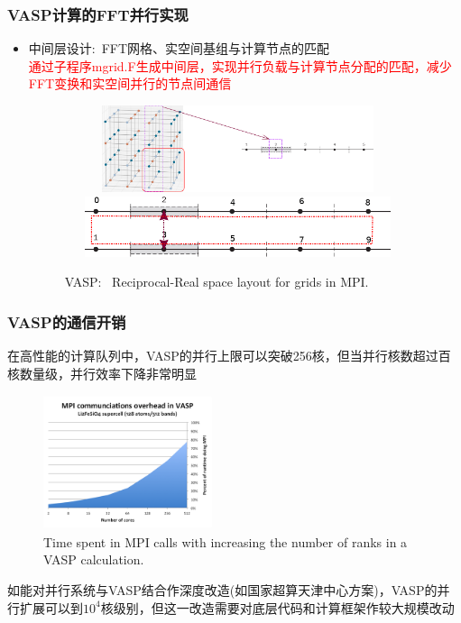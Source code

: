 \frame
{
	\frametitle{\textrm{VASP}计算的\textrm{FFT}并行实现}
	\begin{itemize}
	     \item 中间层设计:~\textrm{FFT}网格、实空间基组与计算节点的匹配\\
		     \textcolor{red}{通过子程序\textrm{mgrid.F}生成中间层，实现并行负载与计算节点分配的匹配，减少\textrm{FFT}变换和实空间并行的节点间通信}
\begin{figure}[h!]
		\vspace{-0.25in}
	\centering
\includegraphics[height=1.0in,width=4.0in,viewport=0 0 1500 450,clip]{Figures/VASP_FFT-MPI_Reciprocal.png}
\vskip 0.5pt
\includegraphics[height=0.7in,width=4.0in,viewport=0 0 730 150,clip]{Figures/VASP_FFT-MPI_Real.png}
\caption{\tiny \textrm{VASP:~ Reciprocal-Real space layout for grids in MPI.}}%
\label{MPI-FFT}
\end{figure} 
	\end{itemize}
}

\frame
{
	\frametitle{\textrm{VASP}的通信开销}
	在高性能的计算队列中，\textrm{VASP}的并行上限可以突破256核，但当并行核数超过百核数量级，并行效率下降非常明显
\begin{figure}[h!]
	\vspace{-0.15in}
\centering
\includegraphics[height=1.55in,width=1.95in,viewport=0 0 240 200,clip]{Figures/VASP-mpi-Li128.png}
\caption{\tiny \textrm{Time spent in MPI calls with increasing the number of ranks in a VASP calculation.}}%
\label{VASP_communication}
\end{figure} 

如能对并行系统与\textrm{VASP}结合作深度改造(如国家超算天津中心方案)，\textrm{VASP}的并行扩展可以到$10^4$核级别，但这一改造需要对底层代码和计算框架作较大规模改动
}

